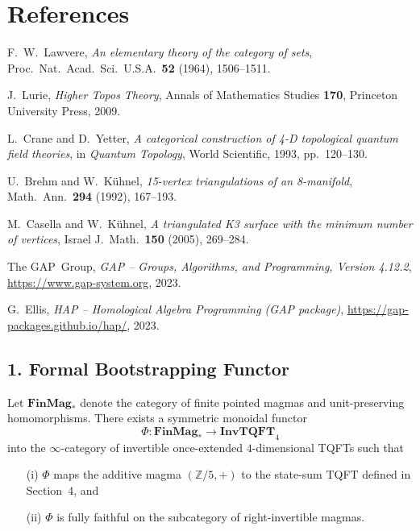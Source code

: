 \documentclass[11pt]{article}
\begin{document}
\section*{References}
\begingroup
\renewcommand{\section}[2]{}   %
\begin{thebibliography}{99}

F.~W.~Lawvere, \textit{An elementary theory of the category of sets}, Proc.\ Nat.\ Acad.\ Sci.\ U.S.A.\ \textbf{52} (1964), 1506--1511.

J.~Lurie, \textit{Higher Topos Theory}, Annals of Mathematics Studies \textbf{170}, Princeton University Press, 2009.

L.~Crane and D.~Yetter, \textit{A categorical construction of 4-D topological quantum field theories}, in \textit{Quantum Topology}, World Scientific, 1993, pp.\ 120--130.

U.~Brehm and W.~Kühnel, \textit{15-vertex triangulations of an 8-manifold}, Math.\ Ann.\ \textbf{294} (1992), 167--193.

M.~Casella and W.~Kühnel, \textit{A triangulated K3 surface with the minimum number of vertices}, Israel J.\ Math.\ \textbf{150} (2005), 269--284.

The GAP~Group, \textit{GAP -- Groups, Algorithms, and Programming, Version 4.12.2}, \url{https://www.gap-system.org}, 2023.

G.~Ellis, \textit{HAP -- Homological Algebra Programming (GAP package)}, \url{https://gap-packages.github.io/hap/}, 2023.

\end{thebibliography}
\endgroup

\section*{Open Problems \& Conjectures}

\subsection*{1.  Formal Bootstrapping Functor}
\begin{conjecture}
Let $\mathbf{FinMag}_*$ denote the category of finite pointed magmas and unit-preserving homomorphisms.
There exists a symmetric monoidal functor
\[
\Phi\colon\mathbf{FinMag}_*\longrightarrow\mathbf{InvTQFT}_{4}
\]
into the $\infty$-category of invertible once-extended $4$-dimensional TQFTs such that
\begin{enumerate}
\item[\normalfont(i)] $\Phi$ maps the additive magma $(\mathbb{Z}/5,+)$ to the state-sum TQFT defined in Section~4, and
\item[\normalfont(ii)] $\Phi$ is fully faithful on the subcategory of right-invertible magmas.
\end{enumerate}
\end{conjecture}
\end{document}
